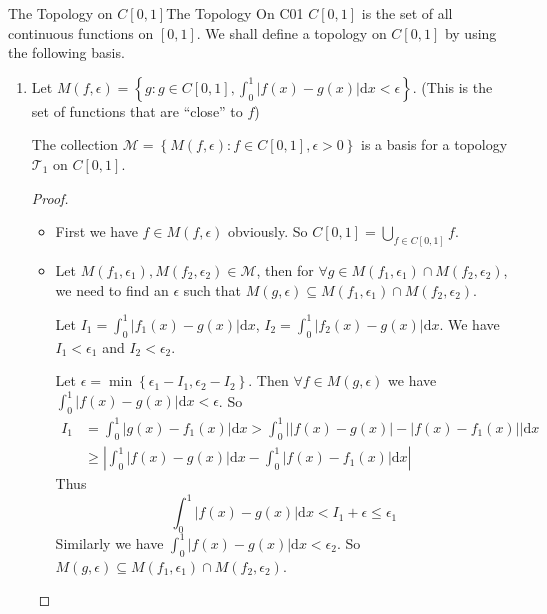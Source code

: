 \documentclass[../main.tex]{subfiles}
\begin{document}
\begin{example}{The Topology on $C[0,1]$}{The Topology On C01}
	$C[0,1]$ is the set of all continuous functions on $[0,1]$. We shall define a topology on $C[0,1]$ by using the following basis.
\begin{enumerate}
\item Let $M(f,\epsilon) = \left\{ g:g\in C[0,1], \int_0^1 \left|f(x)-g(x)\right| \mathrm{d}x < \epsilon \right\}$. (This is the set of functions that are ``close'' to $f$)

	The collection $\mathcal{M} = \left\{ M(f,\epsilon): f\in C[0,1], \epsilon >0  \right\}$ is a basis for a topology $\mathcal{T}_1$ on $C[0,1]$.
	\begin{proof}
	\begin{itemize}
		\item First we have $f\in M(f,\epsilon)$ obviously. So $C[0,1] = \bigcup_{f\in C[0,1]} f$.
		\item Let $M(f_1,\epsilon_1),M(f_2,\epsilon_2)\in \mathcal{M}$, then for $\forall g\in M(f_1,\epsilon_1)\cap M(f_2,\epsilon_2)$, we need to find an $\epsilon$ such that $M(g,\epsilon) \subseteq M(f_1,\epsilon_1)\cap M(f_2,\epsilon_2)$.

			Let $I_1 = \int_0^1 \left|f_1(x)-g(x)\right| \mathrm{d}x$, $I_2 = \int_0^1 \left|f_2(x)-g(x)\right| \mathrm{d}x$. We have $I_1<\epsilon_1$ and $I_2<\epsilon_2$.

			Let $\epsilon = \min\left\{ \epsilon_1-I_1, \epsilon_2-I_2 \right\}$. Then $\forall f\in M(g,\epsilon)$ we have $\int_{0}^{1} \left|f(x)-g(x)\right| \mathrm{d}x < \epsilon$. So
		\begin{equation*}
		\begin{aligned}
			I_1 &= \int_{0}^{1} \left|g(x)-f_1(x)\right| \mathrm{d}x > \int_{0}^{1} \left|\left|f(x)-g(x)\right| - \left|f(x)-f_1(x)\right|\right| \mathrm{d}x\\
				   &\geq \left|\int_{0}^{1} \left|f(x)-g(x)\right| \mathrm{d}x - \int_{0}^{1} \left|f(x)-f_1(x)\right| \mathrm{d}x\right|
		\end{aligned}
		\end{equation*}
		Thus
		\begin{equation*}
		\int_{0}^{1} \left|f(x)-g(x)\right| \mathrm{d}x < I_1 + \epsilon \leq \epsilon_1
		\end{equation*}
		Similarly we have $\int_{0}^{1} \left|f(x)-g(x)\right| \mathrm{d}x < \epsilon_2$. So $M(g,\epsilon) \subseteq  M(f_1,\epsilon_1)\cap M(f_2,\epsilon_2)$.
	\end{itemize}
	\end{proof}


\end{enumerate}
\end{example}
\end{document}
